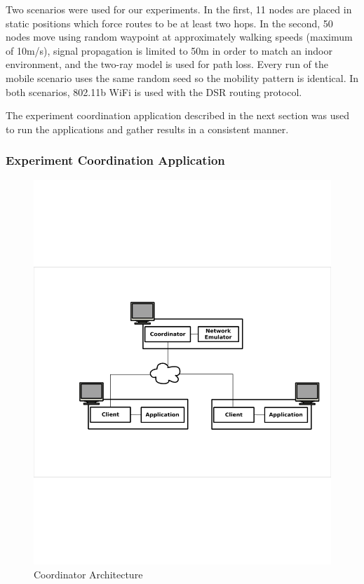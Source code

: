 \documentclass[lnicst]{svmultln}
\begin{document}
Two scenarios were used for our experiments. In the first, 11 nodes are placed in static positions which force routes to be at least two hops. In the second, 50 nodes move using random waypoint at approximately walking speeds (maximum of 10m/s), signal propagation is limited to 50m in order to match an indoor environment, and the two-ray model is used for path loss. Every run of the mobile scenario uses the same random seed so the mobility pattern is identical. In both scenarios, 802.11b WiFi is used with the DSR\cite{dsr} routing protocol.

The experiment coordination application described in the next section was used to run the applications and gather results in a consistent manner.

\subsubsection{Experiment Coordination Application}

\begin{figure}
\centering
\includegraphics[scale = .34, clip, trim = 94px 279px 24px 252px]{figures/experiment_arch.pdf}
\caption{Coordinator Architecture}
\label{fig:coordarchitecture}
\end{figure}
\end{document}

